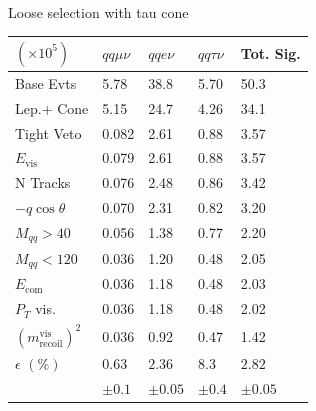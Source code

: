 \begin{table}

\begin{minipage}{0.49\linewidth}
\scriptsize
\quad \quad \\
Loose selection with tau cone\\
 \begin{tabular}{|p{}|p{}p{}p{}|p{}|}
\hline 
 $(\times 10^5) $ & $qq\mu\nu$  & $qqe\nu$ & $qq\tau\nu$ & Tot. Sig.\\ \hline 
Base Evts &{5.78 } & {38.8 } & {5.70} & 50.3\\ 
 
Lep.+ Cone &{5.15 } & {24.7 } & {4.26} & 34.1\\ 

Tight Veto &{0.082 } & {2.61 } & {0.88} & 3.57\\ 

$E_{\text{vis}}$ &{0.079 } & {2.61 } & {0.88} & 3.57\\ 

N Tracks &{0.076 } & {2.48 } & {0.86} & 3.42\\ 

$-q\cos\theta$ &{0.070 } & {2.31 } & {0.82} & 3.20\\ 
 
$M_{qq} > 40$ &{0.056 } & {1.38 } & {0.77} & 2.20\\ 

$M_{qq} < 120$ &{0.036 } & {1.20 } & {0.48} & 2.05\\ 
 
$E_{\text{com}}$ &{0.036 } & {1.18 } & {0.48} & 2.03\\ 
 
$P_T$ vis. &{0.036 } & {1.18 } & {0.48 }& 2.02\\ 

$(m^{\text{vis}}_{\text{recoil}})^2$ &{0.036 } & {0.92 } & {0.47} & 1.42\\ 
\hline 
 $\epsilon \, \, (\%)$ & $0.63 $ & $2.36$ & $8.3$ & $2.82$\\ 
  			& $\pm 0.1$ & $\pm 0.05$ & $\pm 0.4$ & $\pm 0.05$\\  
 \hline
 \end{tabular}

\end{minipage}
\label{tab:os}
 \end{table}


